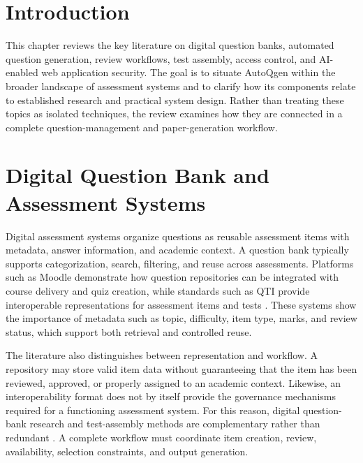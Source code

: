 
\section{Introduction}

This chapter reviews the key literature on digital question banks, automated question generation, review workflows, test assembly, access control, and AI-enabled web application security. The goal is to situate AutoQgen within the broader landscape of assessment systems and to clarify how its components relate to established research and practical system design. Rather than treating these topics as isolated techniques, the review examines how they are connected in a complete question-management and paper-generation workflow.

\section{Digital Question Bank and Assessment Systems}

Digital assessment systems organize questions as reusable assessment items with metadata, answer information, and academic context. A question bank typically supports categorization, search, filtering, and reuse across assessments. Platforms such as Moodle demonstrate how question repositories can be integrated with course delivery and quiz creation, while standards such as QTI provide interoperable representations for assessment items and tests \cite{moodleQuestionBank,moodleQuestionCategories,imsQti3}. These systems show the importance of metadata such as topic, difficulty, item type, marks, and review status, which support both retrieval and controlled reuse.

The literature also distinguishes between representation and workflow. A repository may store valid item data without guaranteeing that the item has been reviewed, approved, or properly assigned to an academic context. Likewise, an interoperability format does not by itself provide the governance mechanisms required for a functioning assessment system. For this reason, digital question-bank research and test-assembly methods are complementary rather than redundant \cite{kurdi2020,vanDerLinden2005}. A complete workflow must coordinate item creation, review, availability, selection constraints, and output generation.

